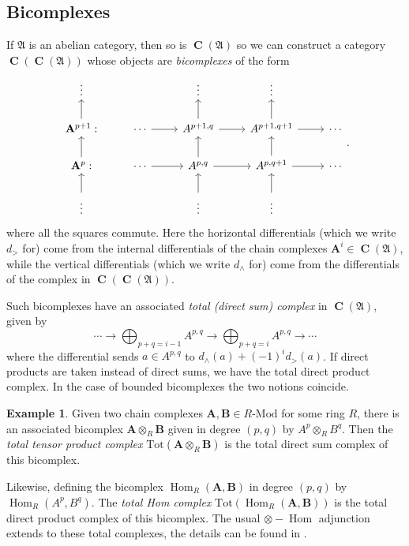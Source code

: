 \documentclass[a4paper]{article}
\theoremstyle{definition}
\newtheorem{example}[defn]{Example}
\theoremstyle{remark}
\newcommand{\Mod}{\ensuremath{\text{-Mod}}}
\DeclareMathOperator{\Hom}{\text{Hom}}
\DeclareMathOperator{\Ch}{\mathbf{C}}
\begin{document}
\subsection{Bicomplexes}

If \(\mathfrak{A}\) is an abelian category, then so is \(\Ch(\mathfrak{A})\) so
we can construct a category \(\Ch(\Ch(\mathfrak{A}))\) whose objects are
\textit{bicomplexes} of the form
\begin{equation}\label{bicomplex}\begin{tikzcd}
    \vdots       &        & \vdots & \vdots &   \\
    \mathbf{A}^{p+1}:\arrow[u] & \cdots\arrow[r] & A^{p+1, q}\arrow[u] \arrow[r] & A^{p+1, q+1} \arrow[r] \arrow[u] & \cdots \\
    \mathbf{A}^p:\arrow[u]     & \cdots\arrow[r] & A^{p, q}\arrow[u]\arrow[r]
                               & A^{p, q+1}\arrow[u] \arrow[r]   & \cdots \\
    \vdots\arrow[u]            &        & \vdots\arrow[u] & \vdots\arrow[u] &   
\end{tikzcd}.\end{equation}
where all the squares commute. Here the horizontal differentials (which we write
\(d_{>}\) for) come from the internal differentials of the chain complexes
\(\mathbf{A}^i\in \Ch(\mathfrak{A})\), while the vertical differentials (which
we write \(d_\wedge\) for) come from the differentials of the complex in
\(\Ch(\Ch(\mathfrak{A}))\). 

Such bicomplexes have an associated \textit{total (direct sum) complex} in
\(\Ch(\mathfrak{A})\), given by 
\[ \cdots \rightarrow \bigoplus_{p+q=i-1}A^{p,q} \longrightarrow
\bigoplus_{p+q=i}A^{p,q} \rightarrow \cdots\]
where the differential sends \(a\in A^{p,q}\) to \(d_\wedge(a) + (-1)^i
d_>(a)\). If direct products are taken instead of direct sums, we have the total
direct product complex. In the case of bounded bicomplexes the two notions
coincide.

\begin{example}
    Given two chain complexes \(\mathbf{A}, \mathbf{B}\in R\Mod\) for some ring
    \(R\), there is an associated bicomplex \(\mathbf{A}\otimes_R \mathbf{B}\)
    given in degree \((p,q)\) by \(A^p\otimes_R B^q\). Then the \textit{total tensor
    product complex} \(\text{Tot}(\mathbf{A}\otimes_R \mathbf{B})\) is the total
    direct sum complex of this bicomplex. 

    Likewise, defining the bicomplex \(\Hom_R(\mathbf{A},\mathbf{B})\) in degree
    \((p,q)\) by \(\Hom_R(A^p,B^q)\). The \textit{total Hom complex}
    \(\text{Tot} (\Hom_R(\mathbf{A},\mathbf{B}))\) is the total direct
    product complex of this bicomplex. The
    usual \({\otimes-\Hom}\) adjunction extends to
    these total complexes, the details can be
    found in .
\end{example} 
\end{document}
